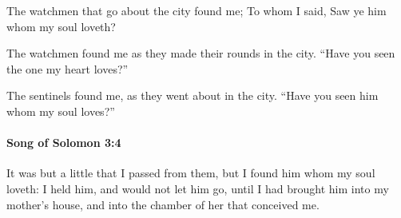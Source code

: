 			\begin{versebox}
					\item[BHS] 
					\item[LXX] 
					\item[ASV] The watchmen that go about the city found me; To whom I said, Saw ye him whom my soul loveth?
					\item[NIV] The watchmen found me as they made their rounds in the city. “Have you seen the one my heart loves?”
					\item[NRSV] The sentinels found me, as they went about in the city. “Have you seen him whom my soul loves?”
			\end{versebox}

		\paragraph{Song of Solomon 3:4} %
			\label{SONGOFSOLOMON-3-4}

			It was but a little that I passed from them, but I found him whom my soul loveth: I held him, and would not let him go, until I had brought him into my mother’s house, and into the chamber of her that conceived me.

